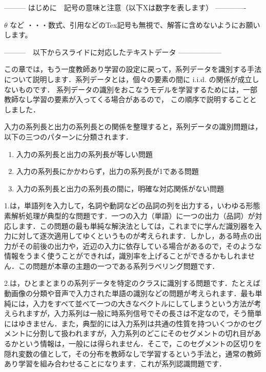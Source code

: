 ﻿--------- はじめに　記号の意味と注意（以下Xは数字を表します） -------------

$\theta$ など       ・・・数式、引用などのTex記号も無視で、解答に含めないようにお願いします。
\cite{mitchell97}

---------　以下からスライドに対応したテキストデータ ------------------


この章では，もう一度教師あり学習の設定に戻って，系列データを識別する手法について説明します．系列データとは，個々の要素の間に i.i.d. の関係が成立しないものです．
系列データの識別をおこなうモデルを学習するためには，一部教師なし学習の要素が入ってくる場合があるので，
この順序で説明することとしました．

入力の系列長と出力の系列長との関係を整理すると，系列データの識別問題は，以下の三つのパターンに分類されます．

\begin{enumerate}
\item 入力の系列長と出力の系列長が等しい問題
\item 入力の系列長にかかわらず，出力の系列長が1である問題
\item 入力の系列長と出力の系列長の間に，明確な対応関係がない問題
\end{enumerate}

1.は，単語列を入力して，名詞や動詞などの品詞の列を出力する，いわゆる形態素解析処理が典型的な問題です．一つの入力（単語）に一つの出力（品詞）が対応します．この問題の最も単純な解決法としては，これまでに学んだ識別器を入力に対して逐次適用してゆくというものが考えられます．しかし，ある時点の出力がその前後の出力や，近辺の入力に依存している場合があるので，そのような情報をうまく使うことができれば，識別率を上げることができるかもしれません．この問題が本章の主題の一つである系列ラベリング問題です．

2.は，ひとまとまりの系列データを特定のクラスに識別する問題です．たとえば動画像の分類や音声で入力された単語の識別などの問題が考えられます．最も単純には，入力をすべて並べて一つの大きなベクトルにしてしまうという方法が考えられますが，入力系列は一般に時系列信号でその長さは不定なので，そう簡単にはゆきません．また，典型的には入力系列は共通の性質を持ついくつかのセグメントに分割して扱われますが，入力系列のどこにそのセグメントの切れ目があるかという情報は，一般には得られません．そこで，このセグメントの区切りを隠れ変数の値として，その分布を教師なしで学習するという手法と，通常の教師あり学習を組み合わせることになります．これが系列認識問題です．

